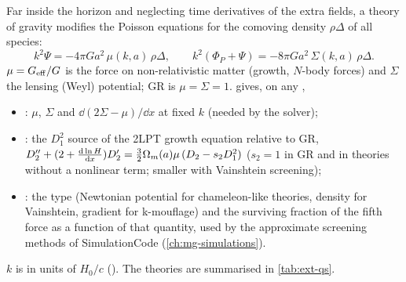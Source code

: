 Far inside the horizon and neglecting time derivatives of the extra fields, a theory of gravity modifies the Poisson
equations for the comoving density $\rho\Delta$ of all species:
\begin{equation}
k^2\Psi=-4\pi Ga^2\,\mu(k,a)\,\rho\Delta,\qquad k^2(\Phi_P+\Psi)=-8\pi Ga^2\,\Sigma(k,a)\,\rho\Delta .
\label{eq:ext-musigma}
\end{equation}
$\mu=G_{\rm eff}/G$ is the force on non-relativistic matter (growth, $N$-body forces) and $\Sigma$ the lensing (Weyl)
potential; GR is $\mu=\Sigma=1$.  gives, on any ,
\begin{itemize}
\item {}: $\mu$, $\Sigma$ and $\dd(2\Sigma-\mu)/\dd x$ at fixed $k$ (needed by the solver);
\item {}: the $D_1^2$ source of the 2LPT growth equation relative to GR,
      $D_2''+(2+\frac{\mathrm{d}\ln H}{\mathrm{d} x})D_2'=\frac32\Omega_m(a)\mu\,(D_2-s_2D_1^2)$ ($s_2=1$ in GR and in theories without a
      nonlinear term; smaller with Vainshtein screening);
\item {}: the type (Newtonian potential for chameleon-like theories, density for Vainshtein, gradient
      for k-mouflage) and the surviving fraction of the fifth force as a function of that quantity, used by the
      approximate screening methods of SimulationCode (\cref{ch:mg-simulations}).
\end{itemize}
$k$ is in units of $H_0/c$ (). The theories are summarised in \cref{tab:ext-qs}.

